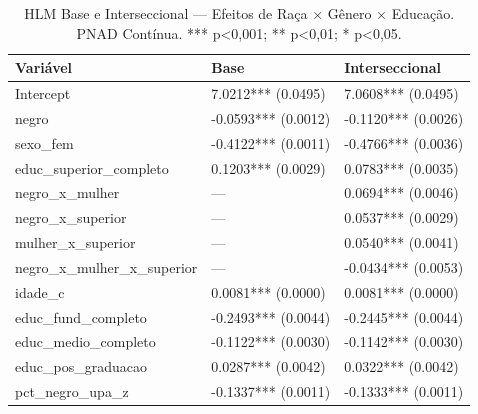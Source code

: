 \begin{table}
\caption{HLM Base e Interseccional — Efeitos de Raça × Gênero × Educação. PNAD Contínua. *** p<0,001; ** p<0,01; * p<0,05.}
\label{tab:interseccional}
\begin{tabular}{lll}
\toprule
Variável & Base & Interseccional \\
\midrule
Intercept & 7.0212*** (0.0495) & 7.0608*** (0.0495) \\
negro & -0.0593*** (0.0012) & -0.1120*** (0.0026) \\
sexo_fem & -0.4122*** (0.0011) & -0.4766*** (0.0036) \\
educ_superior_completo & 0.1203*** (0.0029) & 0.0783*** (0.0035) \\
negro_x_mulher & — & 0.0694*** (0.0046) \\
negro_x_superior & — & 0.0537*** (0.0029) \\
mulher_x_superior & — & 0.0540*** (0.0041) \\
negro_x_mulher_x_superior & — & -0.0434*** (0.0053) \\
idade_c & 0.0081*** (0.0000) & 0.0081*** (0.0000) \\
educ_fund_completo & -0.2493*** (0.0044) & -0.2445*** (0.0044) \\
educ_medio_completo & -0.1122*** (0.0030) & -0.1142*** (0.0030) \\
educ_pos_graduacao & 0.0287*** (0.0042) & 0.0322*** (0.0042) \\
pct_negro_upa_z & -0.1337*** (0.0011) & -0.1333*** (0.0011) \\
\bottomrule
\end{tabular}
\end{table}
